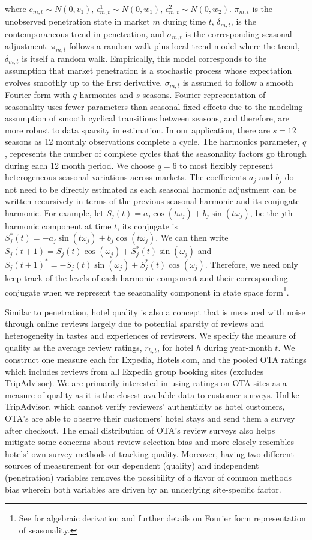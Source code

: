 \documentclass[mksc,blindrev]{informs3} %
\begin{document}
where $e_{m,t}\sim N(0,v_1)\text{, }\epsilon_{m,t}^{1}\sim N(0,w_1)\text{, }\epsilon_{m,t}^{2}\sim N(0,w_2)$. $\pi_{m,t}$ is the unobserved penetration state in market $m$ during time $t$, $\delta_{m,t}$, is the contemporaneous trend in penetration, and $\sigma_{m,t}$ is the corresponding seasonal adjustment. $\pi_{m,t}$ follows a random walk plus local trend model where the trend, $\delta_{m,t}$ is itself a random walk. Empirically, this model corresponds to the assumption that market penetration is a stochastic process whose expectation evolves smoothly up to the first derivative. $\sigma_{m,t}$ is assumed to follow a smooth Fourier form with $q$ harmonics and $s$ seasons. Fourier representation of seasonality uses fewer parameters than seasonal fixed effects due to the modeling assumption of smooth cyclical transitions between seasons, and therefore, are more robust to data sparsity in estimation. In our application, there are $s=12$ seasons as 12 monthly observations complete a cycle. The harmonics parameter, $q$, represents the number of complete cycles that the seasonality factors go through during each 12 month period. We choose $q=6$ to most flexibly represent heterogeneous seasonal variations across markets. The coefficients $a_j$ and $b_j$ do not need to be directly estimated as each seasonal harmonic adjustment can be written recursively in terms of the previous seasonal harmonic and its conjugate harmonic. For example, let $S_j(t)=a_j\cos(t\omega_j)+b_j\sin(t\omega_j)$, be the $j$th harmonic component at time $t$, its conjugate is $S_j^{*}(t)=-a_j\sin(t\omega_j)+b_j\cos(t\omega_j)$. We can then write $S_j(t+1)=S_j(t)\cos(\omega_j)+S_j^{*}(t)\sin(\omega_j)$ and $S_j(t+1)^{*}=-S_j(t)\sin(\omega_j)+S_j^{*}(t)\cos(\omega_j)$. Therefore, we need only keep track of the levels of each harmonic component and their corresponding conjugate when we represent the seasonality component in state space form\footnote{See \citet{petrisDLM} for algebraic derivation and further details on Fourier form representation of seasonality.}.

Similar to penetration, hotel quality is also a concept that is measured with noise through online reviews largely due to potential sparsity of reviews and heterogeneity in tastes and experiences of reviewers. We specify the measure of quality as the average review ratings, $r_{h,t}$, for hotel $h$ during year-month $t$. We construct one measure each for Expedia, Hotels.com, and the pooled OTA ratings which includes reviews from all Expedia group booking sites (excludes TripAdvisor). We are primarily interested in using ratings on OTA sites as a measure of quality as it is the closest available data to customer surveys. Unlike TripAdvisor, which cannot verify reviewers' authenticity as hotel customers, OTA's are able to observe their customers' hotel stays and send them a survey after checkout. The email distribution of OTA's review surveys also helps mitigate some concerns about review selection bias and more closely resembles hotels' own survey methods of tracking quality. Moreover, having two different sources of measurement for our dependent (quality) and independent (penetration) variables removes the possibility of a flavor of common methods bias wherein both variables are driven by an underlying site-specific factor.
\end{document}
